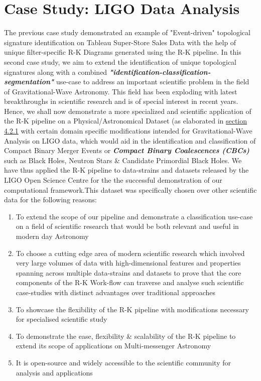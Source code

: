     \section{Case Study: LIGO Data Analysis}

    The previous case study demonstrated an example of "Event-driven" topological signature identification on Tableau Super-Store Sales Data \cite{TableauSuperStore} with the help of unique filter-specific R-K Diagrams generated using the R-K pipeline. In this second case study, we aim to extend the identification of unique topological signatures along with a combined \textit{\textbf{"identification-classification-segmentation"}} use-case to address an important scientific problem in the field of Gravitational-Wave Astronomy. This field has been exploding with latest breakthroughs in scientific research and is of special interest in recent years.\cite{00.3_GravitationalWaveResearch}\cite{00.4_GWRevolution} Hence, we shall now demonstrate a more specialized and scientific application of the R-K pipeline on a  Physical/Astronomical Dataset (as elaborated in \hyperref[sec:PhysicalSystems]{section 4.2.1} with certain domain specific modifications intended for  Gravitational-Wave Analysis\cite{00.1_2012GWAnalysisFormalism} \cite{00.2_schutz2012GWDataAnalysis} on LIGO data, which would aid in the identification and classification of  Compact Binary Merger Events or \textit{\textbf{Compact Binary Coalescences (CBCs)}} \cite{24.0_BinaryMergerIdentification} \cite{24.1_BinaryMergerClassify} such as Black Holes, Neutron Stars \& Candidate Primordial Black Holes. We have thus applied the R-K pipeline to data-strains and datasets released by the LIGO Open Science Centre \cite{01.5_LIGOOpenSci} \cite{00_LIGOOpenSciData} for the the successful demonstration of our computational framework.This dataset was specifically chosen over other scientific data for the following reasons:

    \begin{enumerate}
        \item {To extend the scope of our pipeline and demonstrate a classification use-case on a field of scientific research that would be both relevant and useful in modern day Astronomy}
        \item{To choose a cutting edge area of modern scientific research which involved very large volumes of data with high-dimensional features and properties spanning across multiple data-strains and datasets to prove that the core components of the R-K Work-flow can traverse and analyse such scientific case-studies with distinct advantages over traditional approaches}
        \item {To showcase the flexibility of the R-K pipeline with modifications necessary for specialised scientific study}
        \item{To demonstrate the ease, flexibility \& scalability of the R-K pipeline to extend its scope of applications on Multi-messenger Astronomy }
        \item{It is open-source and widely accessible to the scientific community for analysis and applications }
    \end{enumerate}

